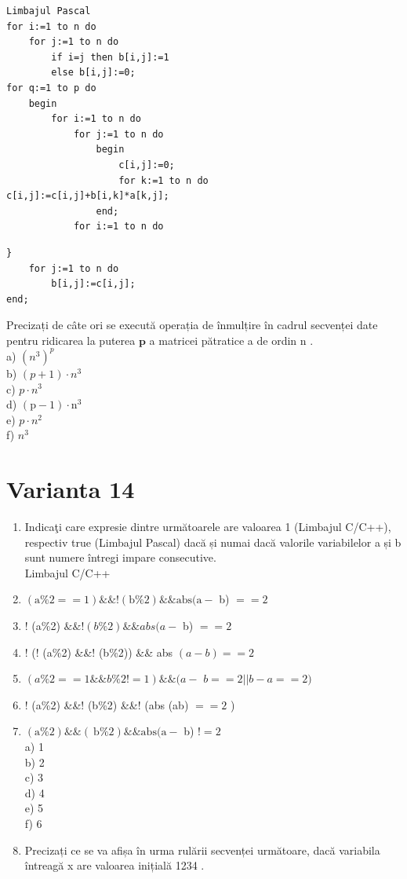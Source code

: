 \documentclass[10pt]{article}
\begin{document}
\begin{verbatim}
Limbajul Pascal
for i:=1 to n do
    for j:=1 to n do
        if i=j then b[i,j]:=1
        else b[i,j]:=0;
for q:=1 to p do
    begin
        for i:=1 to n do
            for j:=1 to n do
                begin
                    c[i,j]:=0;
                    for k:=1 to n do
c[i,j]:=c[i,j]+b[i,k]*a[k,j];
                end;
            for i:=1 to n do
\end{verbatim}

\begin{verbatim}
}
    for j:=1 to n do
        b[i,j]:=c[i,j];
end;
\end{verbatim}

Precizați de câte ori se execută operația de înmulțire în cadrul secvenței date pentru ridicarea la puterea $\mathbf{p}$ a matricei pătratice a de ordin n .\\
a) $\left(n^{3}\right)^{p}$\\
b) $(p+1) \cdot n^{3}$\\
c) $p \cdot n^{3}$\\
d) $(\mathrm{p}-1) \cdot \mathrm{n}^{3}$\\
e) $p \cdot n^{2}$\\
f) $n^{3}$

\section*{Varianta 14}
\begin{enumerate}
  \item Indicaţi care expresie dintre următoarele are valoarea 1 (Limbajul C/C++), respectiv true (Limbajul Pascal) dacă și numai dacă valorile variabilelor a și b sunt numere întregi impare consecutive.\\
Limbajul C/C++
  \item $(\mathrm{a} \% 2==1) \& \&!(\mathrm{b} \% 2) \& \& \mathrm{abs}(\mathrm{a}-$ b) $==2$
  \item ! (a\%2) $\& \&!(b \% 2) \& \& a b s(a-$ b) $==2$
  \item ! (! (a\%2) \&\&! (b\%2)) \&\& abs $(a-b)==2$
  \item $(a \% 2==1 \& \& b \% 2!=1) \& \&(a-$ $b==2| | b-a==2)$
  \item ! (a\%2) \&\&! (b\%2) \&\&! (abs (ab) $==2$ )
  \item $(\mathrm{a} \% 2) \& \&(\mathrm{~b} \% 2) \& \& \mathrm{abs}(\mathrm{a}-$ b) $!=2$\\
a) 1\\
b) 2\\
c) 3\\
d) 4\\
e) 5\\
f) 6
  \item Precizați ce se va afișa în urma rulării secvenței următoare, dacă variabila întreagă x are valoarea inițială 1234 .
\end{enumerate}
\end{document}
